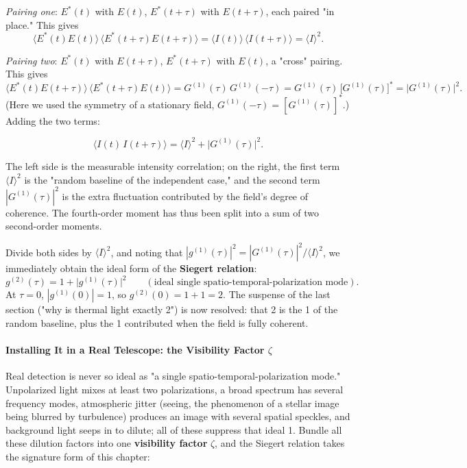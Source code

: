 \emph{Pairing one}: \(E^*(t)\) with \(E(t)\), \(E^*(t+\tau)\) with \(E(t+\tau)\), each paired "in place." This gives
\[
  \langle E^*(t)E(t)\rangle\,\langle E^*(t+\tau)E(t+\tau)\rangle
  =\langle I(t)\rangle\,\langle I(t+\tau)\rangle=\langle I\rangle^2 .
\]

\emph{Pairing two}: \(E^*(t)\) with \(E(t+\tau)\), \(E^*(t+\tau)\) with \(E(t)\), a "cross" pairing. This gives
\[
  \langle E^*(t)E(t+\tau)\rangle\,\langle E^*(t+\tau)E(t)\rangle
  =G^{(1)}(\tau)\,G^{(1)}(-\tau)
  =G^{(1)}(\tau)\,\big[G^{(1)}(\tau)\big]^*
  =\big|G^{(1)}(\tau)\big|^2 .
\]
(Here we used the symmetry of a stationary field, \(G^{(1)}(-\tau)=[G^{(1)}(\tau)]^*\).) Adding the two terms:

\begin{equation}
  \big\langle I(t)\,I(t+\tau)\big\rangle=\langle I\rangle^2+\big|G^{(1)}(\tau)\big|^2 .
  \label{eq:e08-G2-factor}
\end{equation}
\begin{formulaexplain}
The left side is the measurable intensity correlation; on the right, the first term \(\langle I\rangle^2\) is the "random baseline of the independent case," and the second term \(|G^{(1)}(\tau)|^2\) is the extra fluctuation contributed by the field's degree of coherence. The fourth-order moment has thus been split into a sum of two second-order moments.
\end{formulaexplain}

Divide both sides by \(\langle I\rangle^2\), and noting that \(|g^{(1)}(\tau)|^2=|G^{(1)}(\tau)|^2/\langle I\rangle^2\), we immediately obtain the ideal form of the \textbf{Siegert relation}:
\[
  g^{(2)}(\tau)=1+\big|g^{(1)}(\tau)\big|^2 \qquad(\text{ideal single spatio-temporal-polarization mode}).
\]
At \(\tau=0\), \(|g^{(1)}(0)|=1\), so \(g^{(2)}(0)=1+1=2\). The suspense of the last section ("why is thermal light exactly 2") is now resolved: that 2 is the 1 of the random baseline, plus the 1 contributed when the field is fully coherent.

\paragraph{Installing It in a Real Telescope: the Visibility Factor \texorpdfstring{$\zeta$}{zeta}}
\label{sec:e08-zeta}

Real detection is never so ideal as "a single spatio-temporal-polarization mode." Unpolarized light mixes at least two polarizations, a broad spectrum has several frequency modes, atmospheric jitter (seeing, the phenomenon of a stellar image being blurred by turbulence) produces an image with several spatial speckles, and background light seeps in to dilute; all of these suppress that ideal 1. Bundle all these dilution factors into one \textbf{visibility factor} \(\zeta\), and the Siegert relation takes the signature form of this chapter:


